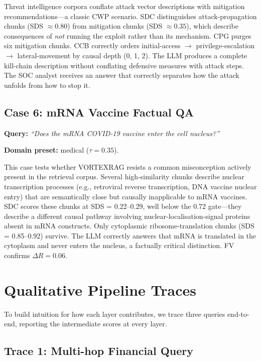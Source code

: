 \documentclass[10pt,twocolumn]{article}
\newcommand{\secvspace}{\vspace{-4pt}}
\begin{document}
Threat intelligence corpora conflate attack vector descriptions with mitigation
recommendations---a classic CWP scenario.  SDC distinguishes attack-propagation
chunks (SDS $\approx 0.80$) from mitigation chunks (SDS $\approx 0.35$), which
describe consequences of \emph{not} running the exploit rather than its
mechanism.  CPG purges six mitigation chunks.  CCB correctly orders
initial-access $\to$ privilege-escalation $\to$ lateral-movement by causal
depth (0, 1, 2).  The LLM produces a complete kill-chain description
without conflating defensive measures with attack steps.  The SOC analyst
receives an answer that correctly separates how the attack unfolds from how
to stop it.

\subsection{Case 6: mRNA Vaccine Factual QA}

\noindent\textbf{Query:} \emph{``Does the mRNA COVID-19 vaccine enter the cell nucleus?''}

\noindent\textbf{Domain preset:} medical ($\tau=0.35$).

This case tests whether VORTEXRAG resists a common misconception actively
present in the retrieval corpus.  Several high-similarity chunks describe
nuclear transcription processes (e.g., retroviral reverse transcription,
DNA vaccine nuclear entry) that are semantically close but causally
inapplicable to mRNA vaccines.  SDC scores these chunks at SDS = 0.22--0.29,
well below the 0.72 gate---they describe a different causal pathway involving
nuclear-localisation-signal proteins absent in mRNA constructs.  Only
cytoplasmic ribosome-translation chunks (SDS = 0.85--0.92) survive.
The LLM correctly answers that mRNA is translated in the cytoplasm and
never enters the nucleus, a factually critical distinction.  FV confirms
$\Delta R = 0.06$.

\section{Qualitative Pipeline Traces}\label{sec:qualitative}
\secvspace

To build intuition for how each layer contributes, we trace three queries
end-to-end, reporting the intermediate scores at every layer.

\subsection{Trace 1: Multi-hop Financial Query}
\end{document}
